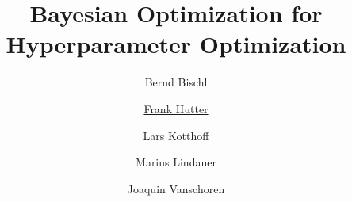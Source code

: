 %  


% 

\usepackage[export]{adjustbox}


\title[Bayesian Optimization for HPO]{Bayesian Optimization for Hyperparameter Optimization} %
\author[Marius Lindauer]{Bernd Bischl \and \underline{Frank Hutter} \and Lars Kotthoff\newline \and Marius Lindauer \and Joaquin Vanschoren}
\institute{}
\date{}



\AtBeginSection[] %
{
}

    


